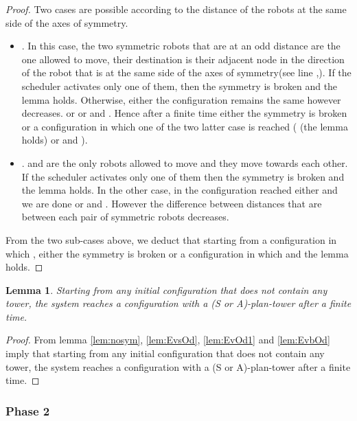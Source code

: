 \documentclass[12pt]{llncs}
\newtheorem{lem}{Lemma}
\begin{document}
\begin{proof} Two cases are possible according to the distance of the robots at the same side of the axes of symmetry.
\begin{itemize}
\item{. In this case, the two symmetric robots that are at an odd distance are the one allowed to move, their destination is their adjacent node in the direction of the robot that is at the same side of the axes of symmetry(see line ,). If the scheduler activates only one of them, then the symmetry is broken and the lemma holds. Otherwise, either the configuration remains the same however  decreases. or  or  and . Hence after a finite time either the symmetry is broken or a configuration in which one of the two latter case is reached ( (the lemma holds) or  and ).} 
\item{.  and  are the only robots allowed to move and they move towards each other. If the scheduler activates only one of them then the symmetry is broken and the lemma holds. In the other case, in the configuration reached either  and we are done or  and . However the difference between distances that are between each pair of symmetric robots decreases.}  
\end{itemize}
From the two sub-cases above, we deduct that starting from a configuration in which , either the symmetry is broken or a configuration in which  and the lemma holds.  
\end{proof}




\begin{lem}
\label{lem:PH1}
Starting from any initial configuration that does not contain any tower, the system reaches a configuration with a (S or A)-plan-tower after a finite time.
\end{lem}

\begin{proof}
From lemma \ref{lem:nosym}, \ref{lem:EvsOd}, \ref{lem:EvOd1} and \ref{lem:EvbOd} imply that starting from any initial configuration that does not contain any tower, the system reaches a configuration with a (S or A)-plan-tower after a finite time.  
\end{proof}











\subsubsection{\textbf{Phase 2}}
\end{document}
